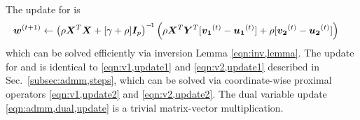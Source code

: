 The update for \w is
\begin{align}
	{\ensuremath{\bm{w}}}^{(t+1)} \leftarrow \left(\rho{\ensuremath{\bm{X}}}^T{\bm{X}} + [\gamma+\rho]\bm{I}_p\right)^{-\!1}  
		\Big(&\rho{\ensuremath{\bm{X}}}^T{\bm{Y}}^T [{\bm{v_1}}^{(t)}-{\bm{u_1}}^{(t)}] 
		+\rho[{\bm{v_2}}^{(t)}-{\bm{u_2}}^{(t)}] \Big) \, \nonumber
\end{align} which can be solved efficiently via inversion Lemma \eqref{eqn:inv,lemma}.
The update for \va and \vb is identical to \eqref{eqn:v1,update1} and \eqref{eqn:v2,update1} described in Sec.~\ref{subsec:admm,steps}, which can be solved via coordinate-wise proximal operators \eqref{eqn:v1,update2} and \eqref{eqn:v2,update2}.
The dual variable update \eqref{eqn:admm,dual,update} is a trivial matrix-vector multiplication.
